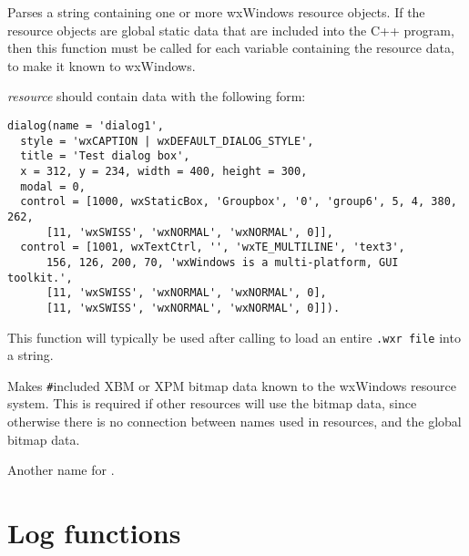 \label{wxresourceparsestring}


Parses a string containing one or more wxWindows resource objects. If
the resource objects are global static data that are included into the
C++ program, then this function must be called for each variable
containing the resource data, to make it known to wxWindows.

{\it resource} should contain data with the following form:

\begin{verbatim}
dialog(name = 'dialog1',
  style = 'wxCAPTION | wxDEFAULT_DIALOG_STYLE',
  title = 'Test dialog box',
  x = 312, y = 234, width = 400, height = 300,
  modal = 0,
  control = [1000, wxStaticBox, 'Groupbox', '0', 'group6', 5, 4, 380, 262,
      [11, 'wxSWISS', 'wxNORMAL', 'wxNORMAL', 0]],
  control = [1001, wxTextCtrl, '', 'wxTE_MULTILINE', 'text3',
      156, 126, 200, 70, 'wxWindows is a multi-platform, GUI toolkit.',
      [11, 'wxSWISS', 'wxNORMAL', 'wxNORMAL', 0],
      [11, 'wxSWISS', 'wxNORMAL', 'wxNORMAL', 0]]).
\end{verbatim}

This function will typically be used after calling  to
load an entire {\tt .wxr file} into a string.

\label{registerbitmapdata}



Makes {\tt\#}included XBM or XPM bitmap data known to the wxWindows resource system.
This is required if other resources will use the bitmap data, since otherwise there
is no connection between names used in resources, and the global bitmap data.

\label{wxresourceregistericondata}

Another name for .

\section{Log functions}\label{logfunctions}

